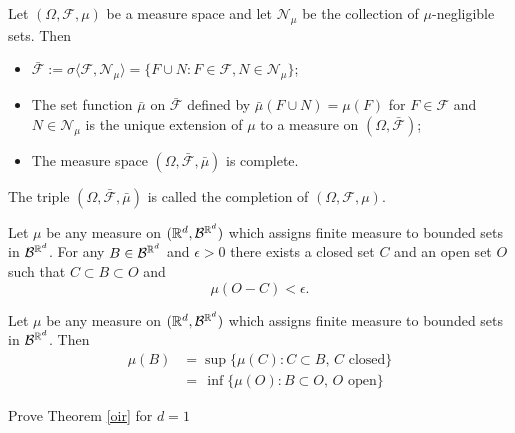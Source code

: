 \begin{theorem}
Let $(\Omega,\mathcal F, \mu)$ be a measure space and let $\mathcal N_\mu$ be the collection of $\mu$-negligible sets.
Then
\begin{itemize}
\item $\bar {\mathcal F}:= \sigma\langle \mathcal F, \mathcal N_\mu\rangle = \{F\cup N: F\in \mathcal F, N\in \mathcal N_\mu  \}$;
\item The set function $\bar \mu$ on $\bar{\mathcal F}$ defined by $\bar\mu(F\cup N)= \mu(F)$ for $F\in\mathcal F$ and $N\in \mathcal N_\mu$ is the unique extension of $\mu$ to a measure on $(\Omega, \bar{\mathcal F})$;
\item The measure space $(\Omega, \bar{\mathcal F}, \bar \mu)$ is complete.
\end{itemize}
The triple $(\Omega, \bar{\mathcal F}, \bar \mu)$ is called the {completion} of  $(\Omega, \mathcal F, \mu)$.
\end{theorem}




\begin{theorem}[{\bf Regularity}]
\label{oir}
Let $\mu$ be any measure on $(\Bbb R^d,\mathcal B^{\Bbb R^d})$ which assigns finite measure to bounded sets in $\mathcal B^{\Bbb R^d}$.
For any  $B\in\mathcal B^{\Bbb R^d}$ and $\epsilon>0$ there exists a closed set $C$ and an open set $O$ such that $C\subset B\subset O$ and
\[\mathcal \mu(O-C)<\epsilon.\]
\end{theorem}

\begin{corollary}
\label{ir}
Let $\mu$ be any measure on $(\Bbb R^d,\mathcal B^{\Bbb R^d})$ which assigns finite measure to bounded sets in $\mathcal B^{\Bbb R^d}$. Then
\begin{align*}
\mathcal \mu(B)  &= \sup \{ \mathcal \mu(C):  C\subset B,\, \text{$C$ closed}\}\\
  &=\, \inf \{ \mu(O):  B\subset O,\, \text{$O$ open}\}
\end{align*}
\end{corollary}




\begin{exercise}
Prove Theorem \ref{oir} for $d=1$
\end{exercise}





